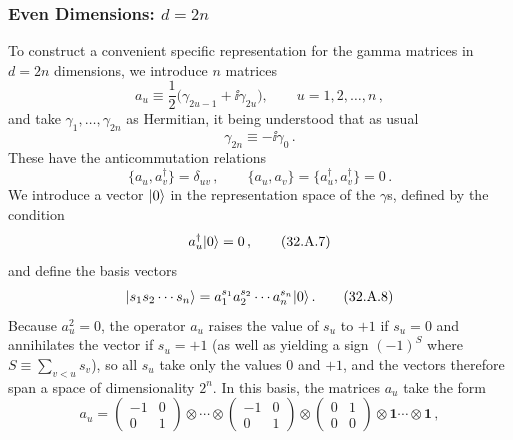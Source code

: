 \subsubsection*{Even Dimensions: \(d=2n\)}

To construct a convenient specific representation for the gamma matrices in
\(d=2n\) dimensions, we introduce \(n\) matrices
\begin{equation}
  a_u\equiv\frac{1}{2}\bigl(\gamma_{2u-1}+\ii\gamma_{2u}\bigr),
  \qquad u=1,2,\ldots,n\,,
  \tag{32.A.4}\label{eq:32.A.4}
\end{equation}
and take \(\gamma_1,\ldots,\gamma_{2n}\) as Hermitian, it being understood
that as usual
\begin{equation}
  \gamma_{2n}\equiv-\ii\gamma_0\,.
  \tag{32.A.5}\label{eq:32.A.5}
\end{equation}
These have the anticommutation relations
\begin{equation}
  \{a_u,a_v^\dagger\}=\delta_{uv}\,,
  \qquad
  \{a_u,a_v\}=\{a_u^\dagger,a_v^\dagger\}=0\,.
  \tag{32.A.6}\label{eq:32.A.6}
\end{equation}
We introduce a vector \(\lvert 0\rangle\) in the representation space of the
\(\gamma\)s, defined by the condition
\begin{equation}
  a_u^\dagger\lvert 0\rangle=0\,,
  \tag{32.A.7}\label{eq:32.A.7}
\end{equation}
and define the basis vectors
\begin{equation}
  \lvert s_1s_2\cdots s_n\rangle
  =a_1^{s_1}a_2^{s_2}\cdots a_n^{s_n}\lvert 0\rangle\,.
  \tag{32.A.8}\label{eq:32.A.8}
\end{equation}
Because \(a_u^2=0\), the operator \(a_u\) raises the value of \(s_u\) to
\(+1\) if \(s_u=0\) and annihilates the vector if \(s_u=+1\) (as well as
yielding a sign \((-1)^S\) where \(S\equiv\sum_{v<u}s_v\)), so all \(s_u\)
take only the values 0 and \(+1\), and the vectors therefore span a space
of dimensionality \(2^n\). In this basis, the matrices \(a_u\) take the
form
\begin{equation}
  a_u=
  \begin{pmatrix}
    -1&0\\
    0&1
  \end{pmatrix}
  \otimes\cdots\otimes
  \begin{pmatrix}
    -1&0\\
    0&1
  \end{pmatrix}
  \otimes
  \begin{pmatrix}
    0&1\\
    0&0
  \end{pmatrix}
  \otimes\mathbf{1}\cdots\otimes\mathbf{1}\,,
  \tag{32.A.9}\label{eq:32.A.9}
\end{equation}
